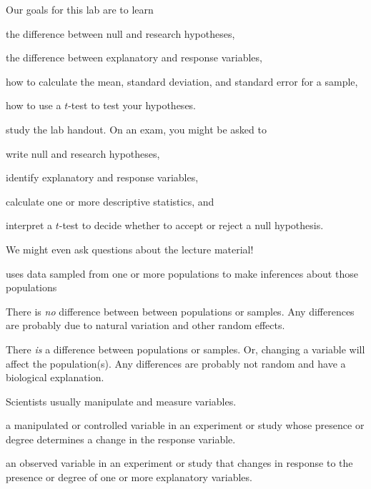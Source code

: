 \documentclass[t]{beamer}
\begin{document}

\begin{frame}[t]{Our goals for this lab are to learn}

	\hangpara the difference between null and research hypotheses,
		
	\hangpara the difference between explanatory and response variables,
	
	\hangpara how to calculate the mean, standard deviation, and standard error for a sample,
	
	\hangpara how to use a $t$-test to test your hypotheses.
	
\end{frame}
%
\begin{frame}{ study the lab handout. On an exam, you might be asked to}

\hangpara write null and research hypotheses,

\hangpara identify explanatory and response variables,

\hangpara calculate one or more descriptive statistics, and

\hangpara interpret a $t$-test to decide whether to accept or reject a null hypothesis.

\hangpara We might even ask questions about the lecture material!

\end{frame}
%
\begin{frame}{ uses data sampled from one or more populations to make inferences about those populations}

\hangpara  {} There is \emph{no} difference between between populations or samples. 	Any differences are probably due to natural variation and other random effects. 
	
\hangpara  {} There \emph{is} a difference between populations or samples. Or, changing a variable will affect the population(s). Any differences are probably not random
	and have a biological explanation. 
	
\end{frame}
%
\begin{frame}{Scientists usually manipulate and measure variables.}

\hangpara  {} a manipulated or controlled variable in an experiment
  or study whose presence or degree determines a change in the response
  variable.  
	
\hangpara  {} an observed variable in an experiment or
  study that changes in response to the presence or degree of one
  or more explanatory variables.  
	
\end{frame}
\end{document}
